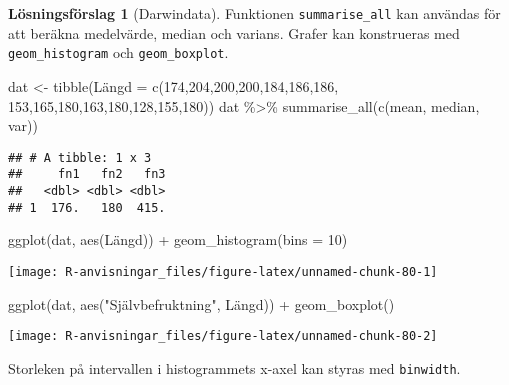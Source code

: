 \documentclass[
]{book}
\newenvironment{Shaded}{\begin{snugshade}}{\end{snugshade}}
\newcommand{\AttributeTok}[1]{\textcolor[rgb]{0.77,0.63,0.00}{#1}}
\newcommand{\DecValTok}[1]{\textcolor[rgb]{0.00,0.00,0.81}{#1}}
\newcommand{\FunctionTok}[1]{\textcolor[rgb]{0.00,0.00,0.00}{#1}}
\newcommand{\NormalTok}[1]{#1}
\newcommand{\OtherTok}[1]{\textcolor[rgb]{0.56,0.35,0.01}{#1}}
\newcommand{\SpecialCharTok}[1]{\textcolor[rgb]{0.00,0.00,0.00}{#1}}
\newcommand{\StringTok}[1]{\textcolor[rgb]{0.31,0.60,0.02}{#1}}
\theoremstyle{definition}
\theoremstyle{definition}
\theoremstyle{definition}
\theoremstyle{definition}
\newtheorem{hypothesis}{Lösningsförslag}[chapter]
\theoremstyle{remark}
\begin{document}
\begin{hypothesis}[Darwindata]
Funktionen \texttt{summarise\_all} kan användas för att beräkna medelvärde, median och varians. Grafer kan konstrueras med \texttt{geom\_histogram} och \texttt{geom\_boxplot}.

\begin{Shaded}
\begin{Highlighting}[]
\NormalTok{dat }\OtherTok{\textless{}{-}} \FunctionTok{tibble}\NormalTok{(Längd }\OtherTok{=} \FunctionTok{c}\NormalTok{(}\DecValTok{174}\NormalTok{,}\DecValTok{204}\NormalTok{,}\DecValTok{200}\NormalTok{,}\DecValTok{200}\NormalTok{,}\DecValTok{184}\NormalTok{,}\DecValTok{186}\NormalTok{,}\DecValTok{186}\NormalTok{,}
                        \DecValTok{153}\NormalTok{,}\DecValTok{165}\NormalTok{,}\DecValTok{180}\NormalTok{,}\DecValTok{163}\NormalTok{,}\DecValTok{180}\NormalTok{,}\DecValTok{128}\NormalTok{,}\DecValTok{155}\NormalTok{,}\DecValTok{180}\NormalTok{))}
\NormalTok{dat }\SpecialCharTok{\%\textgreater{}\%} 
  \FunctionTok{summarise\_all}\NormalTok{(}\FunctionTok{c}\NormalTok{(mean, median, var))}
\end{Highlighting}
\end{Shaded}

\begin{verbatim}
## # A tibble: 1 x 3
##     fn1   fn2   fn3
##   <dbl> <dbl> <dbl>
## 1  176.   180  415.
\end{verbatim}

\begin{Shaded}
\begin{Highlighting}[]
\FunctionTok{ggplot}\NormalTok{(dat, }\FunctionTok{aes}\NormalTok{(Längd)) }\SpecialCharTok{+} 
  \FunctionTok{geom\_histogram}\NormalTok{(}\AttributeTok{bins =} \DecValTok{10}\NormalTok{)}
\end{Highlighting}
\end{Shaded}

\begin{center}\texttt{[image: R-anvisningar\_files/figure-latex/unnamed-chunk-80-1]} \end{center}

\begin{Shaded}
\begin{Highlighting}[]
\FunctionTok{ggplot}\NormalTok{(dat, }\FunctionTok{aes}\NormalTok{(}\StringTok{"Självbefruktning"}\NormalTok{, Längd)) }\SpecialCharTok{+} 
  \FunctionTok{geom\_boxplot}\NormalTok{()}
\end{Highlighting}
\end{Shaded}

\begin{center}\texttt{[image: R-anvisningar\_files/figure-latex/unnamed-chunk-80-2]} \end{center}

Storleken på intervallen i histogrammets x-axel kan styras med \texttt{binwidth}.
\end{hypothesis}
\end{document}

